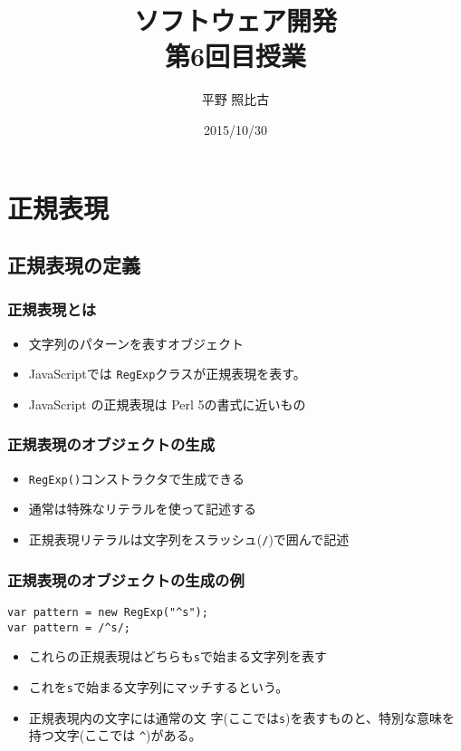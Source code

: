 \documentclass[dvipsk]{beamer}
\title{ソフトウェア開発\\第6回目授業}
\author{平野 照比古}
\institute{}
\date{2015/10/30}
\begin{document}
\frame{\maketitle}
 \section{正規表現}
 \subsection{正規表現の定義}
\begin{frame}[containsverbatim]
 \frametitle{正規表現とは}
\begin{itemize}
 \item 文字列のパターンを表すオブジェクト
 \item JavaScriptでは
\texttt{RegExp}クラスが正規表現を表す。
 \item JavaScript の正規表現は Perl 5の書式に近いもの
\end{itemize}
\end{frame}
\begin{frame}[containsverbatim]
 \frametitle{正規表現のオブジェクトの生成}
\begin{itemize}
 \item \texttt{RegExp()}コンストラクタで生成できる
 \item 通常は特殊なリテラルを使って記述する
 \item 正規表現リテラルは文字列をスラッシュ(\texttt{/})で囲んで記述
\end{itemize}
\end{frame}
\begin{frame}[containsverbatim]
 \frametitle{正規表現のオブジェクトの生成の例}
\begin{verbatim}
var pattern = new RegExp("^s");
var pattern = /^s/;
\end{verbatim}
\begin{itemize}
 \item これらの正規表現はどちらも\texttt{s}で始まる文字列を表す
 \item これを\texttt{s}で始まる文字列にマッチするという。
 \item 正規表現内の文字には通常の文
字(ここでは\texttt{s})を表すものと、特別な意味を持つ文字(ここでは
\verb+^+)がある。
\end{itemize}
\end{frame}
\end{document}
